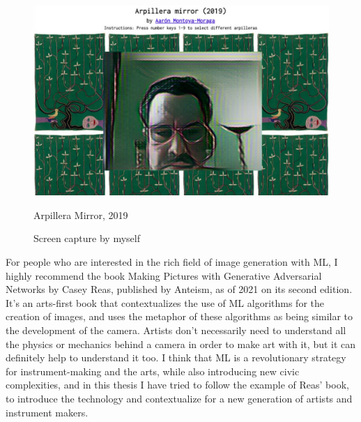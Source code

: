 \begin{figure}[ht]
  \centering
    \includegraphics[width=0.75\linewidth,height=0.35\textheight,keepaspectratio]{images/arpillera-mirror.jpg}
  \caption{Arpillera Mirror, 2019}
  \caption*{Screen capture by myself}
  \label{fig:arpillera-mirror}
\end{figure}

For people who are interested in the rich field of image generation with \acrshort{ML}, I highly recommend the book Making Pictures with Generative Adversarial Networks \cite{making-pictures-with-gans} by Casey Reas, published by Anteism, as of 2021 on its second edition. It’s an arts-first book that contextualizes the use of \acrshort{ML} algorithms for the creation of images, and uses the metaphor of these algorithms as being similar to the development of the camera. Artists don’t necessarily need to understand all the physics or mechanics behind a camera in order to make art with it, but it can definitely help to understand it too. I think that \acrshort{ML} is a revolutionary strategy for instrument-making and the arts, while also introducing new civic complexities, and in this thesis I have tried to follow the example of Reas' book, to introduce the technology and contextualize for a new generation of artists and instrument makers.
